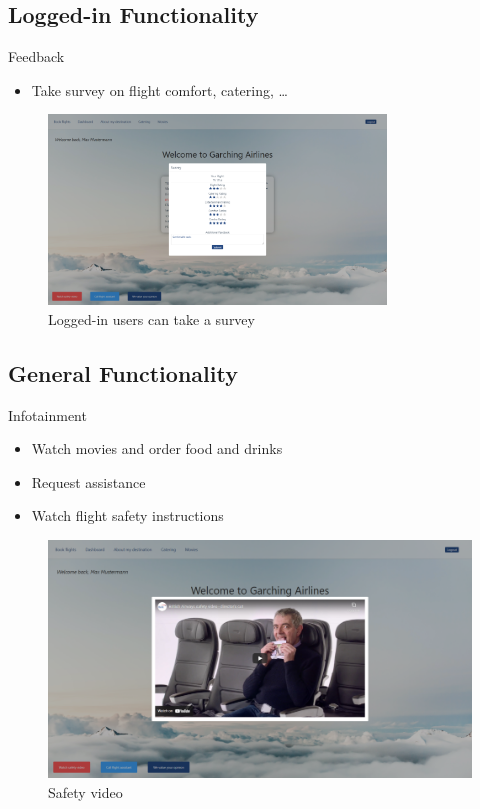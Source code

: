 \documentclass{beamer}
\begin{document}
\subsection{Logged-in Functionality}
\begin{frame}{Feedback}
	\begin{itemize}
		\item Take survey on flight comfort, catering, \dots
	\end{itemize}
	\begin{figure}
		\includegraphics[width=0.8\textwidth]{../images/survey.png}
		\caption{Logged-in users can take a survey}
	\end{figure}
\end{frame}
%
\subsection{General Functionality}
\begin{frame}{Infotainment}
	\begin{itemize}
		\item Watch movies and order food and drinks
		\item Request assistance
		\item Watch flight safety instructions
	\end{itemize}
	\begin{figure}
		\includegraphics[width=.8\textwidth]{../images/SafetyVideo.png}
		\caption{Safety video}
	\end{figure}
\end{frame}
\end{document}
